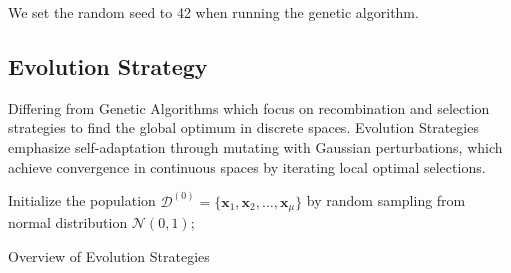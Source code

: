 \documentclass{article}
\begin{document}
We set the random seed to 42 when running the genetic algorithm.

\subsection{Evolution Strategy}

Differing from Genetic Algorithms which focus on recombination and selection strategies to find the global optimum in discrete spaces. Evolution Strategies emphasize self-adaptation through mutating with Gaussian perturbations, which achieve convergence in continuous spaces by iterating local optimal selections.

\begin{algorithm}[!ht]
\SetAlgoLined
{}

\BlankLine

Initialize the population $\mathcal{D}^{(0)} = \{\mathbf{x}_1, \mathbf{x}_2, \dots, \mathbf{x}_{\mu}\}$ by random sampling from normal distribution $\mathcal{N}(0,1)$;

\BlankLine
{}

\BlankLine
{}

\BlankLine
{}

\caption{Overview of Evolution Strategies}\label{al:es-outline}
\end{algorithm}
\end{document}
